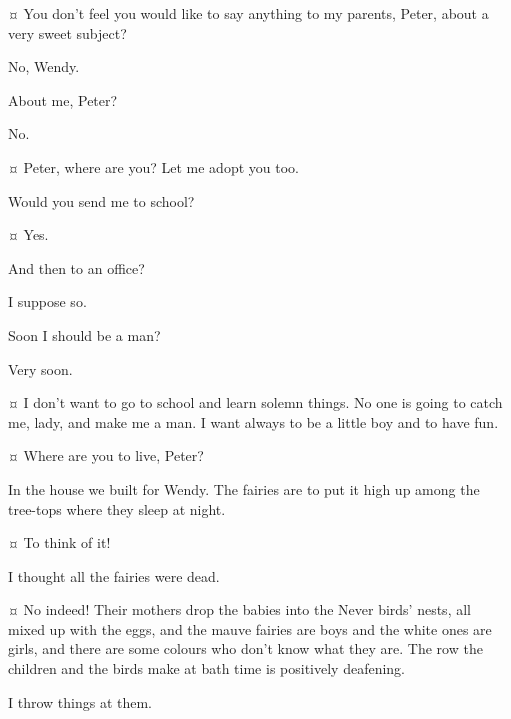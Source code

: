 \begin{drama}
\wendyspeaks {}¤
You don't feel you would like to say anything to my parents, Peter, about a very sweet subject?

\peterspeaks
No, Wendy.

\wendyspeaks
About me, Peter?

\peterspeaks
No.

\mrsdarlingspeaks {}¤
Peter, where are you?
Let me adopt you too.


\peterspeaks
Would you send me to school?

\mrsdarlingspeaks {}¤
Yes.

\peterspeaks
And then to an office?

\mrsdarlingspeaks
I suppose so.

\peterspeaks
Soon I should be a man?

\mrsdarlingspeaks
Very soon.

\peterspeaks {}¤
I don't want to go to school and learn solemn things.
No one is going to catch me, lady, and make me a man.
I want always to be a little boy and to have fun.


\mrsdarlingspeaks {}¤
Where are you to live, Peter?

\peterspeaks
In the house we built for Wendy.
The fairies are to put it high up among the tree-tops where they sleep at night.

\wendyspeaks {}¤
To think of it!

\mrsdarlingspeaks
I thought all the fairies were dead.

\wendyspeaks {}¤
No indeed!
Their mothers drop the babies into the Never birds' nests, all mixed up with the eggs,
and the mauve fairies are boys and the white ones are girls,
and there are some colours who don't know what they are.
The row the children and the birds make at bath time is positively deafening.

\peterspeaks
I throw things at them.


\end{drama}
